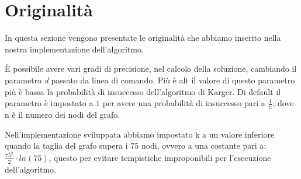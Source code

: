 \chapter{Originalità\label{sec:originalita}}
\noindent In questa sezione vengono presentate le originalità che abbiamo inserito nella nostra implementazione dell'algoritmo.


È possibile avere vari gradi di precisione, nel calcolo della soluzione, cambiando il parametro \textit{d} passato da linea di comando. Più è alt il valore di questo parametro più è bassa la probabilità di insuccesso dell'algoritmo di Karger.
Di default il parametro è impostato a $1$ per avere una probabilità di insuccesso pari a \(\frac{1}{n}\), dove n è il numero dei nodi del grafo.

Nell'implementazione sviluppata abbiamo impostato k a un valore inferiore quando la taglia del grafo supera i $75$ nodi, ovvero a una costante pari a: \(\frac{75^{2}}{2}\cdot ln(75)\), questo per evitare tempistiche improponibili per l'esecuzione dell'algoritmo.
